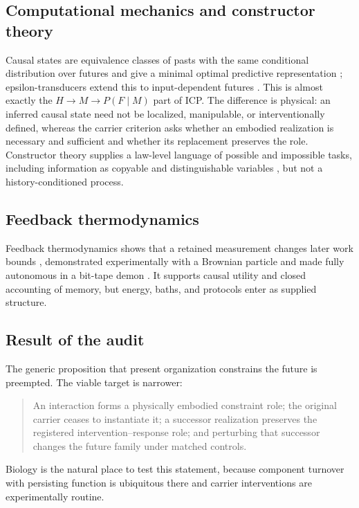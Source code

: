 \subsection{Computational mechanics and constructor theory}

Causal states are equivalence classes of pasts with the same conditional
distribution over futures and give a minimal optimal predictive representation
\citep{ShaliziCrutchfield2001ComputationalMechanics}; epsilon-transducers extend
this to input-dependent futures \citep{BarnettCrutchfield2015Transducer}. This
is almost exactly the $H\rightarrow M\rightarrow P(F\mid M)$ part of ICP. The
difference is physical: an inferred causal state need not be localized,
manipulable, or interventionally defined, whereas the carrier criterion asks
whether an embodied realization is necessary and sufficient and whether its
replacement preserves the role. Constructor theory supplies a law-level
language of possible and impossible tasks, including information as copyable
and distinguishable variables \citep{Deutsch2013Constructor,
DeutschMarletto2015Information}, but not a history-conditioned process.

\subsection{Feedback thermodynamics}

Feedback thermodynamics shows that a retained measurement changes later work
bounds \citep{SagawaUeda2010Feedback}, demonstrated experimentally with a
Brownian particle \citep{ToyabeEtAl2010InformationEnergy} and made fully
autonomous in a bit-tape demon \citep{MandalJarzynski2012Demon}. It supports
causal utility and closed accounting of memory, but energy, baths, and
protocols enter as supplied structure.

\subsection{Result of the audit}

The generic proposition that present organization constrains the future is
preempted. The viable target is narrower:
\begin{quote}
An interaction forms a physically embodied constraint role; the original
carrier ceases to instantiate it; a successor realization preserves the
registered intervention--response role; and perturbing that successor changes
the future family under matched controls.
\end{quote}
Biology is the natural place to test this statement, because component
turnover with persisting function is ubiquitous there and carrier
interventions are experimentally routine.
